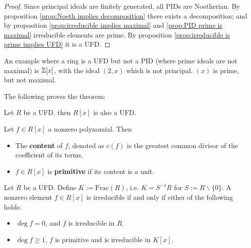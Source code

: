 \begin{proof}
    Since principal ideals are finitely generated, all PIDs are Noetherian. By proposition \ref{prop:Noeth implies decomposition} there exists a decomposition; and by proposition \ref{prop:irreducible implies maximal} and \ref{prop:PID prime is maximal} irreducible elements are prime. By proposition \ref{prop:irreducible is prime implies UFD} it is a UFD.
\end{proof}

\begin{example}
    An example where a ring is a UFD but not a PID (where prime ideals are not maximal) is $\mathbb{Z}[x]$, with the ideal $(2,x)$ which is not principal. $(x)$ is prime, but not maximal.
\end{example}

The following proves the theorem:

\begin{theorem}\label{thm:R UFD implies R[x] UFD}
    Let $R$ be a UFD, then $R[x]$ is also a UFD.
\end{theorem}

\begin{definition}
    Let $f\in R[x]$ a nonzero polynomial. Then
    \begin{itemize}
        \item The \textbf{content} of $f$, denoted as $c(f)$ is the greatest common divisor of the coefficient of its terms.
        \item $f\in R[x]$ is \textbf{primitive} if its content is a unit.
    \end{itemize}
\end{definition}

\begin{lemma}\label{lem:criterion for polynomial irreducible}
    Let $R$ be a UFD. Define $K := \mathrm{Frac}(R)$, i.e. $K = S^{-1}R$ for $S := R\smallsetminus \{0\}$. A nonzero element $f\in R[x]$ is irreducible if and only if either of the following holds:
    \begin{itemize}
        \item $\deg f = 0$, and $f$ is irreducible in $R$.
        \item $\deg f \geq 1$, $f$ is primitive and is irreducible in $K[x]$. 
    \end{itemize}
\end{lemma}

